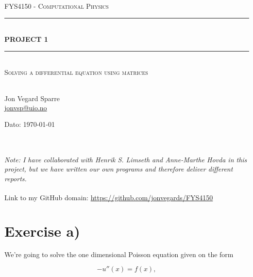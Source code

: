 \documentclass[english, 11pt]{article}
\begin{document}
\begin{titlepage}
\begin{center}

\textsc{\Large FYS4150 - Computational Physics}\\[0.5cm]
\rule{\linewidth}{0.5mm} \\[0.4cm]
{ \huge \bfseries  PROJECT 1}\\[0.10cm]
\rule{\linewidth}{0.5mm} \\[1.5cm]
\textsc{\Large Solving a differential equation using matrices}\\[1.5cm]
\textsc{}\\[1.5cm]


\begin{minipage}{0.49\textwidth}
    \begin{center} \large
        Jon Vegard Sparre\\ \url{jonvsp@uio.no} \\[0.8cm]
    \end{center}
\end{minipage}


\vfill

\large{Dato: \today}

\end{center}
\end{titlepage}

\\ \\
\emph{Note: I have collaborated with Henrik S. Limseth and Anne-Marthe Hovda in this project, but we have written our own programs and therefore deliver different reports.}
\\ \\
Link to my GitHub domain: \url{https://github.com/jonvegards/FYS4150}

\section*{Exercise a)}

We're going to solve the one dimensional Poisson equation given on the form

\begin{equation}
    -u''(x) = f(x), \label{eq:diff}
\end{equation}
\end{document}
